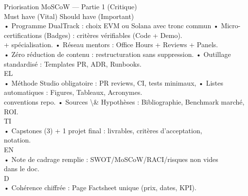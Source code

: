 Priorisation MoSCoW — Partie 1 (Critique)\\
\vspace{0.5em}
\vspace{0.5em}
Must have (Vital)                                                       Should have (Important)\\
• Programme DualTrack : choix EVM ou Solana avec tronc commun           • Micro-certifications (Badges) : critères vérifiables (Code + Demo).\\
+ spécialisation.                                                       • Réseau mentors : Office Hours + Reviews + Panels.\\
• Zéro réduction de contenu : restructuration sans suppression.         • Outillage standardisé : Templates PR, ADR, Runbooks.\\
\vspace{0.5em}
\vspace{0.5em}
\vspace{0.5em}
\vspace{0.5em}
EL\\
• Méthode Studio obligatoire : PR reviews, CI, tests minimaux,          • Listes automatiques : Figures, Tableaux, Acronymes.\\
conventions repo.                                                       • Sources \textbackslash{}& Hypothèses : Bibliographie, Benchmark marché, ROI.\\
\vspace{0.5em}
\vspace{0.5em}
\vspace{0.5em}
\vspace{0.5em}
TI\\
• Capstones (3) + 1 projet final : livrables, critères d’acceptation,\\
notation.\\
\vspace{0.5em}
\vspace{0.5em}
\vspace{0.5em}
\vspace{0.5em}
EN\\
• Note de cadrage remplie : SWOT/MoSCoW/RACI/risques non vides\\
dans le doc.\\
\vspace{0.5em}
\vspace{0.5em}
\vspace{0.5em}
\vspace{0.5em}
D\\
• Cohérence chiffrée : Page Factsheet unique (prix, dates, KPI).\\
